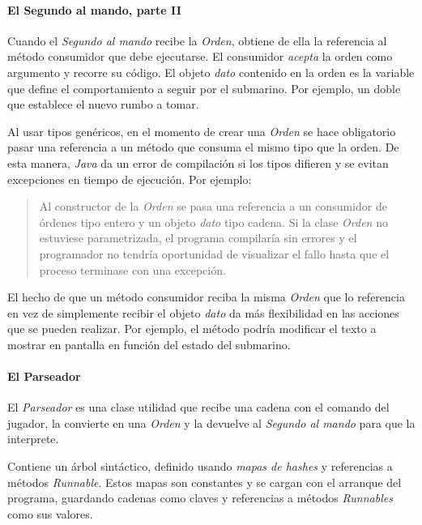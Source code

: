 \documentclass[a4paper,
	11pt,
	parskip=full,
	bibliography=totoc,
	twoside
	]{scrartcl}
\begin{document}
			
		\paragraph{El Segundo al mando, parte II}
			Cuando el \textit{Segundo al mando} recibe la \textit{Orden}, obtiene de ella la referencia al método consumidor que debe ejecutarse. El consumidor \textit{acepta} la orden como argumento y recorre su código. El objeto \textit{dato} contenido en la orden es la variable que define el comportamiento a seguir por el submarino. Por ejemplo, un doble que establece el nuevo rumbo a tomar.
			
			Al usar tipos genéricos, en el momento de crear una \textit{Orden} se hace obligatorio pasar una referencia a un método que consuma el mismo tipo que la orden. De esta manera, \textit{Java} da un error de compilación si los tipos difieren y se evitan excepciones en tiempo de ejecución. Por ejemplo:
			\begin{quote}
				Al constructor de la \textit{Orden} se pasa una referencia a un consumidor de órdenes tipo entero y un objeto \textit{dato} tipo cadena. Si la clase \textit{Orden} no estuviese parametrizada, el programa compilaría sin errores y el programador no tendría oportunidad de visualizar el fallo hasta que el proceso terminase con una excepción.
			\end{quote}
			
			El hecho de que un método consumidor reciba la misma \textit{Orden} que lo referencia en vez de simplemente recibir el objeto \textit{dato} da más flexibilidad en las acciones que se pueden realizar. Por ejemplo, el método podría modificar el texto a mostrar en pantalla en función del estado del submarino.
			
		\paragraph{El Parseador}
			El \textit{Parseador} es una clase utilidad que recibe una cadena con el comando del jugador, la convierte en una \textit{Orden} y la devuelve al \textit{Segundo al mando} para que la interprete.
			
			Contiene un árbol sintáctico, definido usando \textit{mapas de hashes} y referencias a métodos \textit{Runnable}\footnotemark. Estos mapas son constantes y se cargan con el arranque del programa, guardando cadenas como claves y referencias a métodos \textit{Runnables} como sus valores.
			
\end{document}
